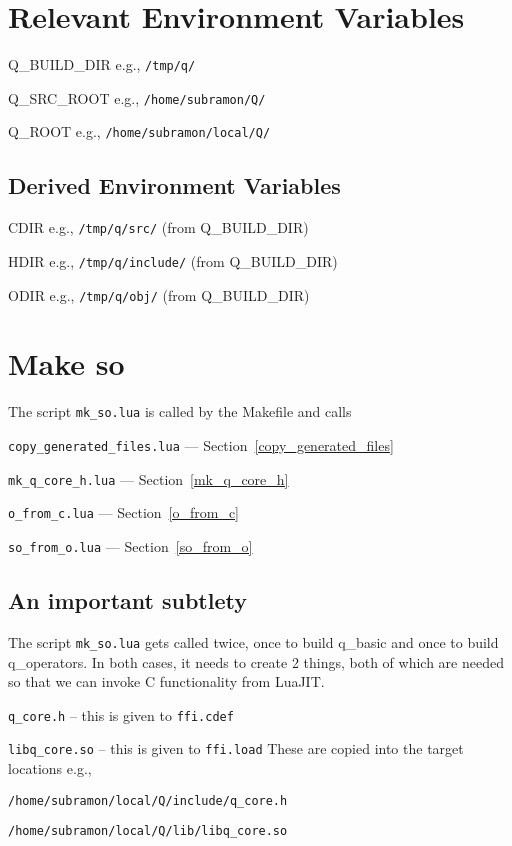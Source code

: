 
\section{Relevant Environment Variables}
\be
\item Q\_BUILD\_DIR e.g., \verb+/tmp/q/+
\item Q\_SRC\_ROOT e.g., \verb+/home/subramon/Q/+
\item Q\_ROOT e.g., \verb+/home/subramon/local/Q/+
\ee

\subsection{Derived Environment Variables}
\be
\item CDIR e.g., \verb+/tmp/q/src/+ (from Q\_BUILD\_DIR)
\item HDIR e.g., \verb+/tmp/q/include/+ (from Q\_BUILD\_DIR)
\item ODIR e.g., \verb+/tmp/q/obj/+ (from Q\_BUILD\_DIR)
\ee

\section{Make so}

The script {\tt mk\_so.lua} is called by the Makefile and calls
\be 
\item {\tt copy\_generated\_files.lua} --- 
Section~\ref{copy_generated_files}
\item {\tt mk\_q\_core\_h.lua} --- Section~\ref{mk_q_core_h}
\item {\tt o\_from\_c.lua} --- Section~\ref{o_from_c}
\item {\tt so\_from\_o.lua} --- Section~\ref{so_from_o}
\ee

\subsection{An important subtlety}

The script \verb+mk_so.lua+ gets called twice, 
once to build q\_basic and once to build q\_operators.
In both cases, it needs to create 2 things, both of which are needed so that we
can invoke C functionality from LuaJIT.
\be
\item \verb+q_core.h+ -- this is given to {\tt ffi.cdef}
\item \verb+libq_core.so+ -- this is given to {\tt ffi.load}
\ee
These are copied into the target locations e.g.,
\be
\item \verb+/home/subramon/local/Q/include/q_core.h+
\item \verb+/home/subramon/local/Q/lib/libq_core.so+
\ee

